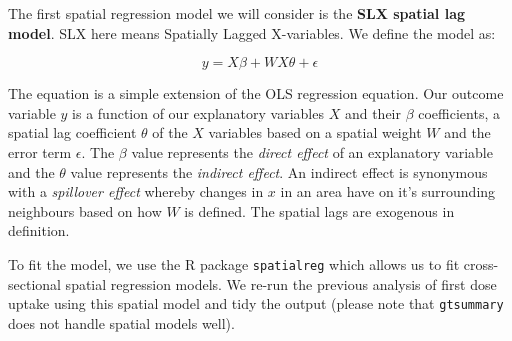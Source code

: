 \documentclass[
]{book}
\begin{document}
The first spatial regression model we will consider is the \textbf{SLX spatial lag model}. SLX here means Spatially Lagged X-variables. We define the model as:

\[
y = X \beta + WX \theta + \epsilon
\]

The equation is a simple extension of the OLS regression equation. Our outcome variable \(y\) is a function of our explanatory variables \(X\) and their \(\beta\) coefficients, a spatial lag coefficient \(\theta\) of the \(X\) variables based on a spatial weight \(W\) and the error term \(\epsilon\). The \(\beta\) value represents the \emph{direct effect} of an explanatory variable and the \(\theta\) value represents the \emph{indirect effect}. An indirect effect is synonymous with a \emph{spillover effect} whereby changes in \(x\) in an area have on it's surrounding neighbours based on how \(W\) is defined. The spatial lags are exogenous in definition.

To fit the model, we use the R package \texttt{spatialreg} which allows us to fit cross-sectional spatial regression models. We re-run the previous analysis of first dose uptake using this spatial model and tidy the output (please note that \texttt{gtsummary} does not handle spatial models well).
\end{document}
